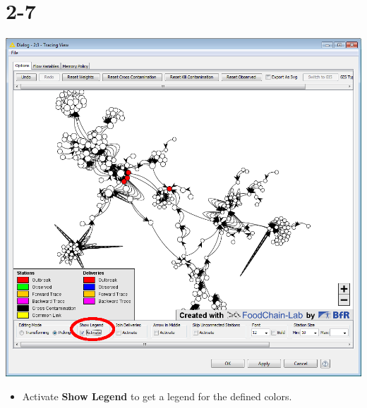 \documentclass{beamer}
\begin{document}
\section{2-7}
\begin{frame}
	\begin{center}
  		\includegraphics[height=0.6\textheight]{2-7.png}
	\end{center}
	\begin{itemize}
		\item Activate \textbf{Show Legend} to get a legend for the defined colors.
	\end{itemize}
\end{frame}
\end{document}
